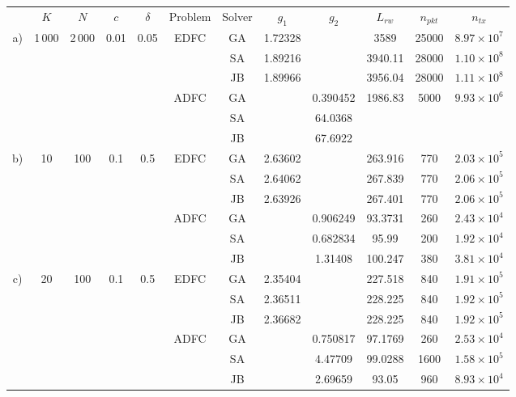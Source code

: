 \renewcommand{\arraystretch}{0.9}
\begin{tabular}{c c c c c c c c c c c c} \toprule
& $K$ & $N$ & $c$ & $\delta$ & Problem & Solver & $g_1$ & $g_2$ & $L_{rw}$ & $n_{pkt}$ & $n_{tx}$ \\
\cmidrule{2-12}
\multirow{6}{*}{a)} & \multirow{6}{*}{1\,000} & \multirow{6}{*}{2\,000} & \multirow{6}{*}{0.01} & \multirow{6}{*}{0.05}
  & \multirow{3}{*}{EDFC}
     & GA & 1.72328 &  & 3589 & 25000 & $8.97 \times 10^{7}$ \\
&&&&&& SA & 1.89216 &  & 3940.11 & 28000 & $1.10 \times 10^{8}$ \\
&&&&&& JB & 1.89966 &  & 3956.04 & 28000 & $1.11 \times 10^{8}$ \\
 &&&&& \multirow{3}{*}{ADFC}
     & GA &  & 0.390452 & 1986.83 & 5000 & $9.93 \times 10^{6}$ \\
&&&&&& SA &  & 64.0368 &  &  & \\
&&&&&& JB &  & 67.6922 &  &  & \\
\cmidrule{2-12}
\multirow{6}{*}{b)} & \multirow{6}{*}{10} & \multirow{6}{*}{100} & \multirow{6}{*}{0.1} & \multirow{6}{*}{0.5}
  & \multirow{3}{*}{EDFC}
     & GA & 2.63602 &  & 263.916 & 770 & $2.03 \times 10^{5}$ \\
&&&&&& SA & 2.64062 &  & 267.839 & 770 & $2.06 \times 10^{5}$ \\
&&&&&& JB & 2.63926 &  & 267.401 & 770 & $2.06 \times 10^{5}$ \\
&&&&& \multirow{3}{*}{ADFC}
     & GA &  & 0.906249 & 93.3731 & 260 & $2.43 \times 10^{4}$ \\
&&&&&& SA &  & 0.682834 & 95.99 & 200 & $1.92 \times 10^{4}$ \\
&&&&&& JB &  & 1.31408 & 100.247 & 380 & $3.81 \times 10^{4}$ \\
\cmidrule{2-12}
\multirow{6}{*}{c)} & \multirow{6}{*}{20} & \multirow{6}{*}{100} & \multirow{6}{*}{0.1} & \multirow{6}{*}{0.5}
  & \multirow{3}{*}{EDFC}
     & GA & 2.35404 &  & 227.518 & 840 & $1.91 \times 10^{5}$ \\
&&&&&& SA & 2.36511 &  & 228.225 & 840 & $1.92 \times 10^{5}$ \\
&&&&&& JB & 2.36682 &  & 228.225 & 840 & $1.92 \times 10^{5}$ \\
&&&&& \multirow{3}{*}{ADFC}
     & GA &  & 0.750817 & 97.1769 & 260 & $2.53 \times 10^{4}$ \\
&&&&&& SA &  & 4.47709 & 99.0288 & 1600 & $1.58 \times 10^{5}$ \\
&&&&&& JB &  & 2.69659 & 93.05 & 960 & $8.93 \times 10^{4}$ \\

\end{tabular}
